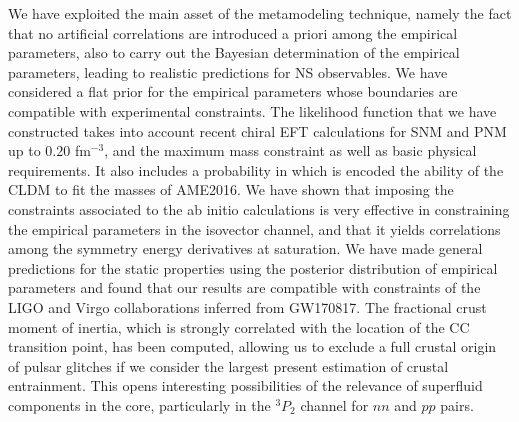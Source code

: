 We have exploited the main asset of the metamodeling technique, namely the 
fact that no artificial correlations are introduced a priori among the 
empirical parameters, also to carry out the Bayesian determination of the 
empirical parameters, leading to realistic predictions for NS observables. We 
have considered a flat prior for the empirical parameters whose boundaries are
compatible with experimental constraints. 
The likelihood function that we have constructed takes into account recent 
chiral EFT calculations for SNM and PNM up to $0.20$ fm$^{-3}$, and 
the maximum mass constraint as well as basic physical requirements. 
It also includes a probability in which is encoded the ability of the CLDM to 
fit the masses of AME2016. We have shown that imposing the constraints
associated to the ab initio calculations is very effective in constraining the 
empirical parameters in the isovector channel, and that it yields 
correlations among the symmetry energy derivatives at saturation.
We have made general predictions for the static properties using the posterior 
distribution of empirical parameters and found that our results are compatible 
with constraints of the LIGO and Virgo collaborations inferred from GW170817.
%
%
The fractional crust moment of inertia, which is strongly correlated with the 
location of the CC transition point, has been computed, allowing us to exclude 
a full crustal origin of pulsar glitches if we consider the largest present 
estimation of crustal entrainment. This opens interesting possibilities of the
relevance of superfluid components in the core, particularly in the $^3P_2$
channel for $nn$ and $pp$ pairs.

